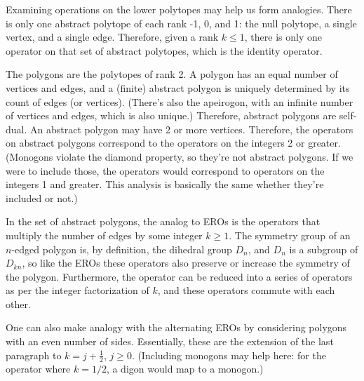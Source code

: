 \documentclass[12pt]{amsart}%
\begin{document}
Examining operations on the lower polytopes may help us form analogies.
There is only one abstract polytope of each rank -1, 0, and 1:
the null polytope, a single vertex, and a single edge. Therefore,
given a rank $k \le 1$, there is only one operator on that set of abstract
polytopes, which is the identity operator.

The polygons are the polytopes of rank 2. A polygon has an equal number of
vertices and edges, and a (finite) abstract polygon is uniquely determined by
its count of edges (or vertices). (There's also the apeirogon, with an infinite
number of vertices and edges, which is also unique.) Therefore, abstract
polygons are self-dual. An abstract polygon may have 2 or more vertices.
Therefore, the operators on abstract polygons correspond to the operators on
the integers 2 or greater. (Monogons violate the diamond property, so they're
not abstract polygons. If we were to include those, the operators would
correspond to operators on the integers 1 and greater.
This analysis is basically the same whether they're included or not.)

In the set of abstract polygons, the analog to EROs is the operators that
multiply the number of edges by some integer $k \ge 1$. The symmetry group of
an $n$-edged polygon is, by definition, the dihedral group $D_n$, and $D_n$ is
a subgroup of $D_{kn}$, so like the EROs these operators also preserve or
increase the symmetry of the polygon. Furthermore, the operator can be reduced
into a series of operators as per the integer factorization of $k$, and these
operators commute with each other.

One can also make analogy with the alternating EROs by considering polygons
with an even number of sides. Essentially, these are the extension of the last
paragraph to $k = j + \frac{1}{2}$, $j \ge 0$. (Including monogons may help
here: for the operator where $k=1/2$, a digon would map to a monogon.)
\end{document}

